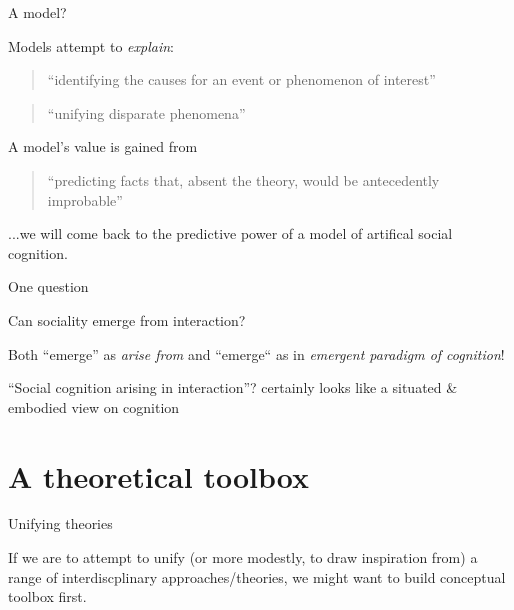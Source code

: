 \documentclass[compress]{beamer}
\begin{document}
{
\begin{frame}{A model?}

    Models attempt to \emph{explain}: 
    \begin{quote}
        ``identifying the causes for an event or phenomenon of interest''
    \end{quote}
    \begin{quote}
        ``unifying disparate phenomena''
    \end{quote}

        A model's value is gained from
    \begin{quote}
        ``predicting facts that, absent the theory, would be antecedently
        improbable''
    \end{quote}

    \pause

    ...we will come back to the predictive power of a model of artifical social
    cognition.

\end{frame}
}

\begin{frame}{One question}

    \Large
    \centering

    Can sociality emerge from interaction?

    \pause
    \normalsize
    \vspace{2em}

    Both ``emerge'' as \emph{arise from} and ``emerge`` as in \emph{emergent paradigm of
    cognition}!

    \pause

    ``Social cognition arising in interaction''? certainly looks like a situated \&
    embodied view on cognition

\end{frame}

 \section{A theoretical toolbox}

 \begin{frame}{Unifying theories}

     If we are to attempt to unify (or more modestly, to draw inspiration from) a range
     of interdiscplinary approaches/theories, we might want to build conceptual
     toolbox first.
 \end{frame}
\end{document}
